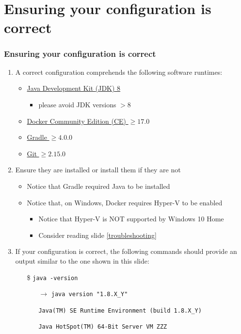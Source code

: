 \documentclass[handout]{beamer}\mode<presentation>{\usetheme{AMSCesenaBleu}}
\begin{document}
\section{Ensuring your configuration is correct}

\begin{frame}[allowframebreaks]
\frametitle{Ensuring your configuration is correct}

	\begin{enumerate}

    \item A correct configuration comprehends the following software runtimes:
    \begin{itemize}
        \item \href{http://www.oracle.com/technetwork/java/javase/downloads/jdk8-downloads-2133151.html}{Java Development Kit (JDK) 8} 
        \begin{itemize}
            \item \alert{please avoid JDK versions $> 8$}
        \end{itemize}
        \item \href{https://www.docker.com/products/docker-desktop}{Docker Community Edition (CE) $\geq 17.0$}
        \item \href{https://gradle.org/releases}{Gradle $\geq 4.0.0$}
        \item \href{https://git-scm.com}{Git $\geq 2.15.0$}
    \end{itemize}

	\item Ensure they are installed or install them if they are not
	\begin{itemize}
		\item Notice that Gradle required Java to be installed
		\item Notice that, on Windows, Docker requires \alert{Hyper-V} to be enabled 
		\begin{itemize}
			\item Notice that Hyper-V is NOT supported by Windows 10 Home
			\item Consider reading slide \ref{troubleshooting}
		\end{itemize}
	\end{itemize}
    
    \framebreak
    
    \item If your configuration is correct, the following commands should provide an output similar to the one shown in this slide:
    \begin{itemize}
        \item[\$] \texttt{java -version}
        \begin{itemize}
            \item[$\rightarrow$] \texttt{java version "1.8.X\_Y"}
            \item[] \texttt{Java(TM) SE Runtime Environment (build 1.8.X\_Y)}
            \item[] \texttt{Java HotSpot(TM) 64-Bit Server VM ZZZ}
        \end{itemize}
        

\end{itemize}
\end{enumerate}
\end{frame}
\end{document}
